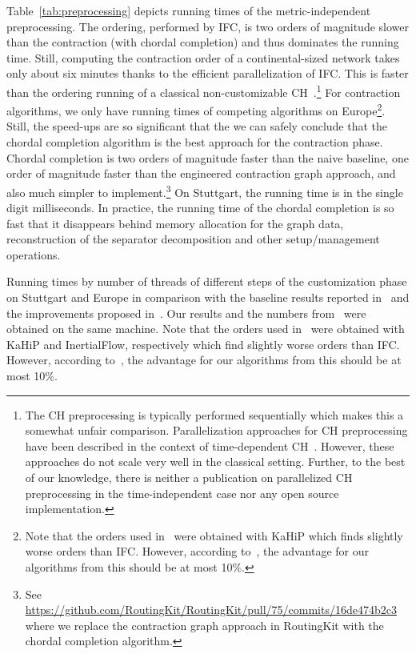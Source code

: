 \documentclass[a4paper, english, cleveref]{lipics-v2021}
\begin{document}
Table~\ref{tab:preprocessing} depicts running times of the metric-independent preprocessing.
The ordering, performed by IFC, is two orders of magnitude slower than the contraction (with chordal completion) and thus dominates the running time.
Still, computing the contraction order of a continental-sized network takes only about six minutes thanks to the efficient parallelization of IFC.
This is faster than the ordering running of a classical non-customizable CH~\cite{GeisbergerSSV12}.\footnote{
The CH preprocessing is typically performed sequentially which makes this a somewhat unfair comparison.
Parallelization approaches for CH preprocessing have been described in the context of time-dependent CH~\cite{TODO}.
However, these approaches do not scale very well in the classical setting.
Further, to the best of our knowledge, there is neither a publication on parallelized CH preprocessing in the time-independent case nor any open source implementation.
}
For contraction algorithms, we only have running times of competing algorithms on Europe\footnote{
Note that the orders used in~\cite{DibbeltSW16} were obtained with KaHiP which finds slightly worse orders than IFC.
However, according to~\cite{GottesburenHUW19}, the advantage for our algorithms from this should be at most 10\%.
}.
Still, the speed-ups are so significant that the we can safely conclude that the chordal completion algorithm is the best approach for the contraction phase.
Chordal completion is two orders of magnitude faster than the naive baseline, one order of magnitude faster than the engineered contraction graph approach, and also much simpler to implement.\footnote{See \url{https://github.com/RoutingKit/RoutingKit/pull/75/commits/16de474b2c3} where we replace the contraction graph approach in RoutingKit with the chordal completion algorithm.}
On Stuttgart, the running time is in the single digit milliseconds.
In practice, the running time of the chordal completion is so fast that it disappears behind memory allocation for the graph data, reconstruction of the separator decomposition and other setup/management operations.

\begin{table}
\centering
\setlength{\tabcolsep}{5pt}
\caption{
Running times by number of threads of different steps of the customization phase on Stuttgart and Europe in comparison with the baseline results reported in~\cite{DibbeltSW16} and the improvements proposed in~\cite{BuchholdSW19}.
Our results and the numbers from~\cite{DibbeltSW16,BuchholdSW19} were obtained on the same machine.
Note that the orders used in~\cite{DibbeltSW16,BuchholdSW19} were obtained with KaHiP and InertialFlow, respectively which find slightly worse orders than IFC.
However, according to~\cite{GottesburenHUW19}, the advantage for our algorithms from this should be at most 10\%.
}\label{tab:customization}

\end{table}
\end{document}
